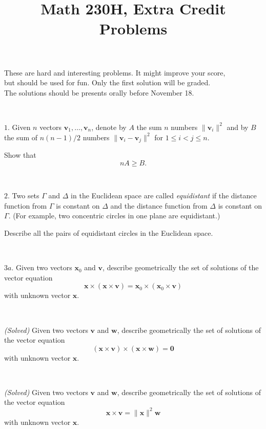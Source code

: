 \documentclass{article}
\def\noi{\noindent}%
\def\ge{\geqslant}%
\def\le{\leqslant}%
\begin{document}
\title{Math 230H, Extra Credit Problems}
\author{}
\date{}
\maketitle

\begin{center}
{\small These are hard and interesting problems.
It might improve your score,\\
but should be used for fun. 
Only the first solution will be graded. 
\\ The solutions should 
be presents orally before November 18.}
\end{center}
\thispagestyle{empty}

\ 

\noi $1$. 
Given $n$ vectors $\mathbf{v}_1,\dots,\mathbf{v}_n$, 
denote by $A$ the sum $n$ numbers $\|\mathbf{v}_i\|^2$
and by $B$ the sum of $n(n-1)/2$ numbers 
$\|\mathbf{v}_i-\mathbf{v}_j\|^2$ for $1\le i<j\le n$.

Show that 
\[n A\ge B.\]

\ 

\noi
$2$. 
Two sets $\Gamma$ and $\Delta$ in the Euclidean space 
are called \emph{equidistant} if the distance function from $\Gamma$ is constant on $\Delta$ and the distance function from $\Delta$ is constant on $\Gamma$.
(For example, two concentric circles in one plane are equidistant.)

Describe all the pairs of equidistant circles in the Euclidean space.

\ 

\noi
$3a$. 
Given two vectors $\mathbf{x}_0$ and $\mathbf{v}$,
describe geometrically the set of solutions of the vector equation
\[\mathbf{x}\times(\mathbf{x}\times\mathbf{v})=\mathbf{x}_0\times(\mathbf{x}_0\times\mathbf{v})\]
with unknown vector  $\mathbf{x}$.

\ 

\noi
{}\textit{(Solved)} 
Given two vectors $\mathbf{v}$ and $\mathbf{w}$,
describe geometrically the set of solutions of the vector equation
\[(\mathbf{x}\times\mathbf{v})\times(\mathbf{x}\times\mathbf{w})=\mathbf{0}\]
with unknown vector  $\mathbf{x}$.

\ 

\noi{}\textit{(Solved)}
Given two vectors $\mathbf{v}$ and $\mathbf{w}$,
describe geometrically the set of solutions of the vector equation
\[\mathbf{x}\times\mathbf{v}=\|\mathbf{x}\|^2\mathbf{w}\]
with unknown vector  $\mathbf{x}$.
\end{document}
